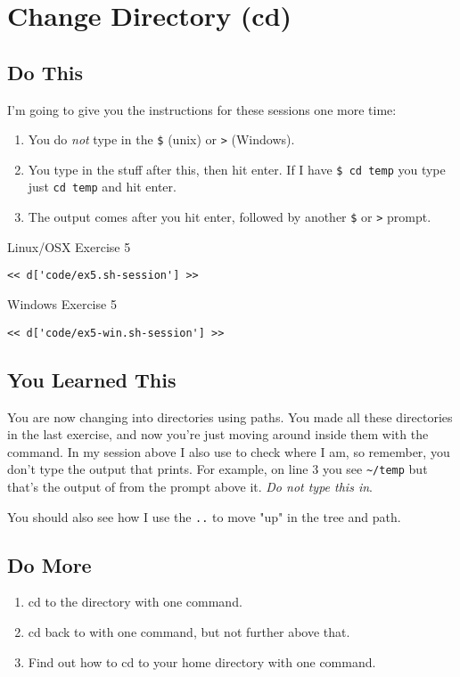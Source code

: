 \chapter{Change Directory (cd)}

\section{Do This}

I'm going to give you the instructions for these sessions one more time:

\begin{enumerate} 
\item You do \emph{not} type in the \verb|$| (unix) or \verb|>| (Windows).
\item You type in the stuff after this, then hit enter.  If I have \verb|$ cd temp| you type just \verb|cd temp| and hit enter.
\item The output comes after you hit enter, followed by another \verb|$| or \verb|>| prompt.
\end{enumerate}

\begin{code}{Linux/OSX Exercise 5}
\begin{Verbatim}
<< d['code/ex5.sh-session'] >>
\end{Verbatim}
\end{code}

\begin{code}{Windows Exercise 5}
\begin{Verbatim}
<< d['code/ex5-win.sh-session'] >>
\end{Verbatim}
\end{code}

\section{You Learned This}

You are now changing into directories using paths.  You made all these directories
in the last exercise, and now you're just moving around inside them with the
 command.  In my session above I also use  to check
where I am, so remember, you don't type the output that  prints.
For example, on line 3 you see \verb|~/temp| but that's the output of 
from the prompt above it.  \emph{Do not type this in}.

You should also see how I use the \verb|..| to move "up" in the tree and path.

\section{Do More}

\begin{enumerate}
\item cd to the  directory with one command.
\item cd back to  with one command, but not further above that.
\item Find out how to cd to your home directory with one command.
\end{enumerate}

